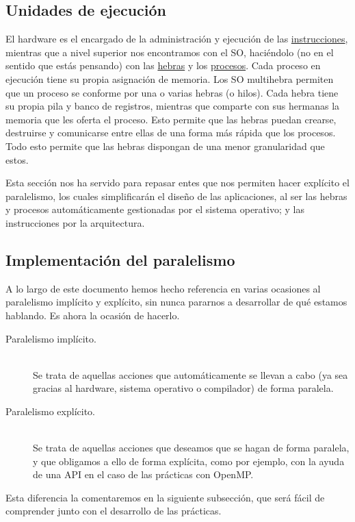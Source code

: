 \subsection{Unidades de ejecución}
El hardware es el encargado de la administración y ejecución de las \ul{instrucciones}, mientras que a nivel superior nos encontramos con el SO, haciéndolo (no en el sentido que estás pensando) con las \ul{hebras} y los \ul{procesos}. Cada proceso en ejecución tiene su propia asignación de memoria. Los SO multihebra permiten que un proceso se conforme por una o varias hebras (o hilos). Cada hebra tiene su propia pila y banco de registros, mientras que comparte con sus hermanas la memoria que les oferta el proceso. Esto permite que las hebras puedan crearse, destruirse y comunicarse entre ellas de una forma más rápida que los procesos. Todo esto permite que las hebras dispongan de una menor granularidad que estos. 

Esta sección nos ha servido para repasar entes que nos permiten hacer explícito el paralelismo, los cuales simplificarán el diseño de las aplicaciones, al ser las hebras y procesos automáticamente gestionadas por el sistema operativo; y las instrucciones por la arquitectura.

\subsection{Implementación del paralelismo}
A lo largo de este documento hemos hecho referencia en varias ocasiones al paralelismo implícito y explícito, sin nunca pararnos a desarrollar de qué estamos hablando. Es ahora la ocasión de hacerlo.
\begin{description}
    \item [Paralelismo implícito.]~\\
        Se trata de aquellas acciones que automáticamente se llevan a cabo (ya sea gracias al hardware, sistema operativo o compilador) de forma paralela.

    \item [Paralelismo explícito.]~\\
        Se trata de aquellas acciones que deseamos que se hagan de forma paralela, y que obligamos a ello de forma explícita, como por ejemplo, con la ayuda de una API en el caso de las prácticas con OpenMP.
\end{description}
Esta diferencia la comentaremos en la siguiente subsección, que será fácil de comprender junto con el desarrollo de las prácticas.

